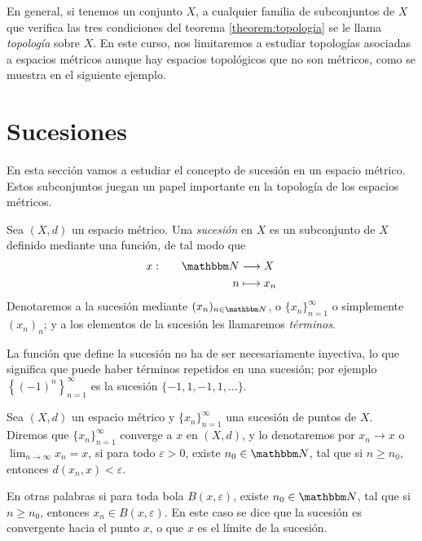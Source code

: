 En general, si tenemos un conjunto $X$, a cualquier familia de subconjuntos de $X$ que verifica las tres condiciones del teorema \ref{theorem:topologia} se le llama \emph{topología} sobre $X$. En este curso, nos limitaremos a estudiar topologías asociadas a espacios métricos aunque hay espacios topológicos que no son métricos, como se muestra en el siguiente ejemplo.

\newpage

\section{Sucesiones}

En esta sección vamos a estudiar el concepto de sucesión en un espacio métrico. Estos subconjuntos juegan un papel importante en la topología de los espacios métricos.

\begin{definicion}{}{}
    Sea $(X, d)$ un espacio métrico. Una \emph{sucesión} en $X$ es un subconjunto de $X$ definido mediante una función, de tal modo que
    \begin{alignat*}{2}
        x &: & \quad \NN & \longrightarrow X \\
        & & n & \longmapsto x_n
    \end{alignat*}
    Denotaremos a la sucesión mediante $(x_n)_{n \in \NN}$, o $\{x_n\}_{n = 1}^{\infty}$ o simplemente $(x_n)_{n}$; y a los elementos de la sucesión les llamaremos \emph{términos}.
\end{definicion}

La función que define la sucesión no ha de ser necesariamente inyectiva, lo que significa que puede haber términos repetidos en una sucesión; por ejemplo $\left\{(-1)^n\right\}_{n = 1}^{\infty}$ es la sucesión $\{-1, 1, -1, 1, \dots \}$.

\begin{definicion}{}{}
    Sea $(X, d)$ un espacio métrico y $\{x_n\}_{n = 1}^{\infty}$ una sucesión de puntos de $X$. Diremos que $\{x_n\}_{n = 1}^{\infty}$ converge a $x$ en $(X, d)$, y lo denotaremos por $x_n \to x$ o $\displaystyle \lim_{n \to \infty} x_n = x$, si para todo $\varepsilon > 0$, existe $n_0 \in \NN$, tal que si $n \geq n_0$, entonces $d(x_n, x) < \varepsilon$.
\end{definicion}

En otras palabras si para toda bola $B(x, \varepsilon)$, existe $n_0 \in \NN$, tal que si $n \geq n_0$, entonces $x_n \in B(x, \varepsilon)$. En este caso se dice que la sucesión es convergente hacia el punto $x$, o que $x$ es el límite de la sucesión.

